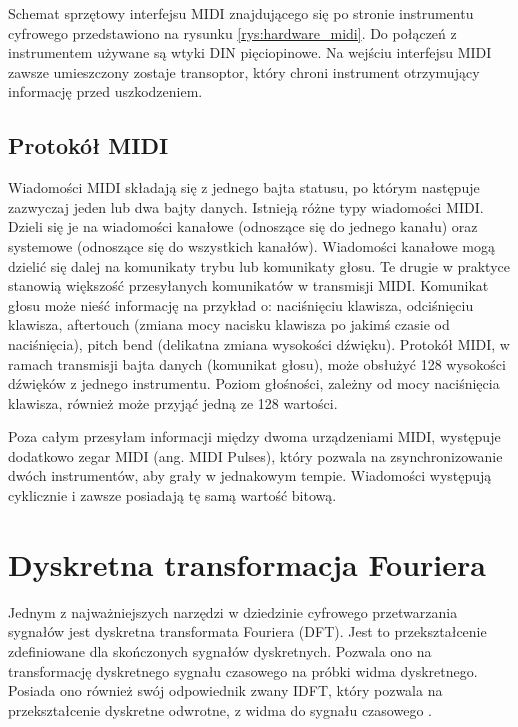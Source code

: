 Schemat sprzętowy interfejsu MIDI znajdującego się po stronie instrumentu cyfrowego przedstawiono na rysunku \ref{rys:hardware_midi}. Do połączeń z instrumentem używane są wtyki DIN pięciopinowe. Na wejściu interfejsu MIDI zawsze umieszczony zostaje transoptor, który chroni instrument otrzymujący informację przed uszkodzeniem.

\subsection{Protokół MIDI}
Wiadomości MIDI składają się z jednego bajta statusu, po którym następuje zazwyczaj jeden lub dwa bajty danych. Istnieją różne typy wiadomości MIDI. Dzieli się je na wiadomości kanałowe (odnoszące się do jednego kanału) oraz systemowe (odnoszące się do wszystkich kanałów). Wiadomości kanałowe mogą dzielić się dalej na komunikaty trybu lub komunikaty głosu. Te drugie w praktyce stanowią większość przesyłanych komunikatów w transmisji MIDI.
Komunikat głosu może nieść informację na przykład o: naciśnięciu klawisza, odciśnięciu klawisza, aftertouch (zmiana mocy nacisku klawisza po jakimś czasie od naciśnięcia), pitch bend (delikatna zmiana wysokości dźwięku). Protokół MIDI, w ramach transmisji bajta danych (komunikat głosu), może obsłużyć 128 wysokości dźwięków z jednego instrumentu. Poziom głośności, zależny od mocy naciśnięcia klawisza, również może przyjąć jedną ze 128 wartości.

Poza całym przesyłam informacji między dwoma urządzeniami MIDI, występuje dodatkowo zegar MIDI (ang. MIDI Pulses), który pozwala na zsynchronizowanie dwóch instrumentów, aby grały w jednakowym tempie. Wiadomości występują cyklicznie i zawsze posiadają tę samą wartość bitową.



\section{Dyskretna transformacja Fouriera}
Jednym z najważniejszych narzędzi w dziedzinie cyfrowego przetwarzania sygnałów jest dyskretna transformata Fouriera (DFT). Jest to przekształcenie zdefiniowane dla skończonych sygnałów dyskretnych. Pozwala ono na transformację dyskretnego sygnału czasowego na próbki widma dyskretnego. Posiada ono również swój odpowiednik zwany IDFT, który pozwala na przekształcenie dyskretne odwrotne, z widma do sygnału czasowego \cite{lesnicki}.

